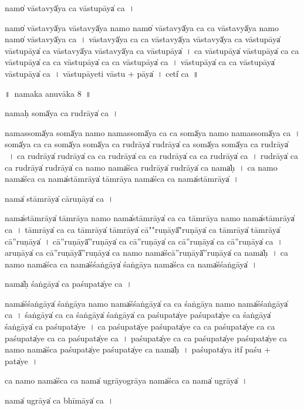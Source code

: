 \documentclass[parskip, DIV=14]{scrartcl}
\begin{document}
{namo̍ vāsta॒vyā̍ya ca vāstu॒pāya̍ ca~।

namo̍ vāsta॒vyā̍ya vāsta॒vyā̍ya॒ namo॒ namo̍ vāsta॒vyā̍ya ca ca vāsta॒vyā̍ya॒ namo॒ namo̍ vāsta॒vyā̍ya ca~।
vā॒sta॒vyā̍ya ca ca vāsta॒vyā̍ya vāsta॒vyā̍ya ca vāstu॒pāya̍ vāstu॒pāya̍ ca vāsta॒vyā̍ya vāsta॒vyā̍ya ca vāstu॒pāya̍~।
ca॒ vā॒stu॒pāya̍ vāstu॒pāya̍ ca ca vāstu॒pāya̍ ca ca vāstu॒pāya̍ ca ca vāstu॒pāya̍ ca~।
vā॒stu॒pāya̍ ca ca vāstu॒pāya̍ vāstu॒pāya̍ ca~।
vā॒stu॒pāyeti vāstu + pāya̍~।
ceti̍ ca~॥

\newpage
\LARGE
॥~namaka anuvāka 8~॥ 
\Large

nama॒ḥ somā̍ya ca ru॒drāya̍ ca॒~।

nama॒ssomā̍ya॒ somā̍ya॒ namo॒ nama॒ssomā̍ya ca ca॒ somā̍ya॒ namo॒ nama॒ssomā̍ya ca~।
somā̍ya ca ca॒ somā̍ya॒ somā̍ya ca ru॒drāya̍ ru॒drāya̍ ca॒ somā̍ya॒ somā̍ya ca ru॒drāya̍ ~।
ca॒ ru॒drāya̍ ru॒drāya̍ ca ca ru॒drāya̍ ca ca ru॒drāya̍ ca ca ru॒drāya̍ ca~।
ru॒drāya̍ ca ca ru॒drāya̍ ru॒drāya̍ ca॒ namo॒ nama̍śca ru॒drāya̍ ru॒drāya̍ ca॒ nama̍ḥ~।
ca॒ namo॒ nama̍śca ca॒ nama̍stā॒mrāya̍ tā॒mrāya॒ nama̍śca ca॒ nama̍stā॒mrāya̍~।

nama̍ stā॒mrāya̍ cāru॒ṇāya̍ ca॒~।

nama̍stā॒mrāya̍ tā॒mrāya॒ namo॒ nama̍stā॒mrāya̍ ca ca tā॒mrāya॒ namo॒ nama̍stā॒mrāya̍ ca~।
tā॒mrāya̍ ca ca  tā॒mrāya̍ tā॒mrāya̍ cā""ru॒ṇāyā̍"ru॒ṇāya̍ ca  tā॒mrāya̍ tā॒mrāya̍ cā''ru॒ṇāya̍~।
cā॒''ru॒ṇāyā̍''ru॒ṇāya̍ ca cā''ru॒ṇāya̍ ca cā''ru॒ṇāya̍ ca cā''ru॒ṇāya̍ ca~। 
a॒ru॒ṇāya̍ ca cā''ru॒ṇāyā̍''ru॒ṇāya̍ ca॒ namo॒ nama̍ścā''ru॒ṇāyā̍''ru॒ṇāya̍ ca॒ nama̍ḥ~। 
ca॒ namo॒ nama̍śca ca॒ nama̍śśa॒ṅgāya̍ śa॒ṅgāya॒ nama̍śca ca॒ nama̍śśa॒ṅgāya̍~।

nama̍ḥ śa॒ṅgāya̍ ca paśu॒pata̍ye ca॒~।

nama̍śśa॒ṅgāya̍ śa॒ṅgāya॒ namo॒ nama̍śśa॒ṅgāya̍ ca ca śa॒ṅgāya॒ namo॒ nama̍śśa॒ṅgāya̍ ca~।
śa॒ṅgāya̍ ca ca śa॒ṅgāya̍ śa॒ṅgāya̍ ca paśu॒pata̍ye paśu॒pata̍ye ca śa॒ṅgāya̍ śa॒ṅgāya̍ ca paśu॒pata̍ye~।
ca॒ pa॒śu॒pata̍ye paśu॒pata̍ye ca ca  paśu॒pata̍ye ca ca paśu॒pata̍ye ca ca  paśu॒pata̍ye ca~।
pa॒śu॒pata̍ye ca ca paśu॒pata̍ye paśu॒pata̍ye ca॒ namo॒ nama̍śca paśu॒pata̍ye paśu॒pata̍ye ca॒ nama̍ḥ~।
pa॒śu॒pata̍ya॒ iti̍ paśu + pata̍ye~।

ca॒ namo॒ nama̍śca ca॒ nama̍ u॒grāyo॒grāya॒ nama̍śca ca॒ nama̍ u॒grāya̍~।

nama̍ u॒grāya̍ ca bhī॒māya̍ ca॒~।

}
\end{document}
